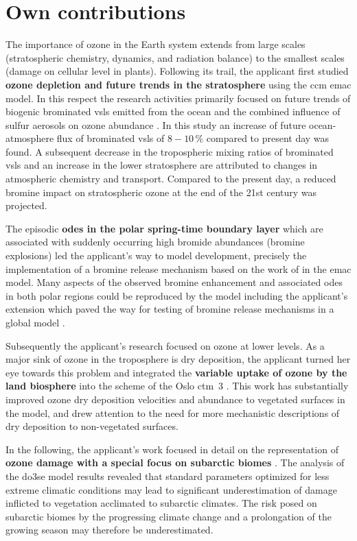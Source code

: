 \section{Own contributions}
\label{sec:contrib}
The importance of ozone in the Earth system extends from large scales (stratospheric chemistry, dynamics, and radiation balance) to the smallest scales (damage on cellular level in plants). Following its trail, the applicant first studied \textbf{ozone depletion and future trends in the stratosphere} using the \gls{ccm} \gls{emac} model. In this respect the research activities primarily focused on future trends of biogenic brominated \gls{vsls} emitted from the ocean and the combined influence of sulfur aerosols on ozone abundance \parencite{ACP:Falk2017}. In this study an increase of future ocean-atmosphere flux of brominated \gls{vsls} of $8-10\,\%$ compared to present day was found. A subsequent decrease in the tropospheric mixing ratios of brominated \gls{vsls} and an increase in the lower stratosphere are attributed to changes in atmospheric chemistry and transport. Compared to the present day, a reduced bromine impact on stratospheric ozone at the end of the 21st century was projected.

The episodic \textbf{\glspl{ode} in the polar spring-time boundary layer} which are associated with suddenly occurring high bromide abundances (bromine explosions) led the applicant's way to model development, precisely the implementation of a bromine release mechanism based on the work of \textcite{ACP:Toyota2011} in the \gls{emac} model. Many aspects of the observed bromine enhancement and associated \glspl{ode} in both polar regions could be reproduced by the model including the applicant's extension which paved the way for testing of bromine release mechanisms in a global model \parencite{GMD:Falk2018}.

Subsequently the applicant’s research focused on ozone at lower levels. As a  major sink of ozone in the troposphere is dry deposition, the applicant turned her eye towards this problem and integrated the \textbf{variable uptake of ozone by the land biosphere} into the scheme of the Oslo \gls{ctm}~3 \parencite{GMD:Falk2019}. This work has substantially improved ozone dry deposition velocities and abundance to vegetated surfaces in the model, and drew attention to the need for more mechanistic descriptions of dry deposition to non-vegetated surfaces.

In the following, the applicant's work focused in detail on the representation of \textbf{ozone damage with a special focus on subarctic biomes} \parencites{ICPTF:Falk2021}{EGU:Falk2021}. The analysis of the \gls{do3se} model results revealed that standard parameters optimized for less extreme climatic conditions may lead to significant underestimation of damage inflicted to vegetation acclimated to subarctic climates. The risk posed on subarctic biomes by the progressing climate change and a prolongation of the growing season may therefore be underestimated.

